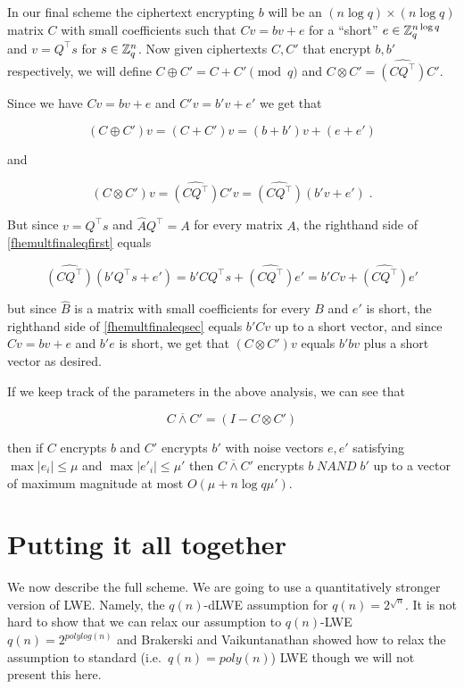 In our final scheme the ciphertext encrypting \(b\) will be an
\((n\log q)\times (n\log q)\) matrix \(C\) with small coefficients such
that \(Cv =bv + e\) for a ``short'' \(e \in {\mathbb{Z}}_q^{n\log q}\) and
\(v=Q^\top s\) for \(s\in{\mathbb{Z}}_q^n\). Now given ciphertexts \(C,C'\) that
encrypt \(b,b'\) respectively, we will define
\(C \oplus C' = C + C' \pmod{q}\) and
\(C \otimes C' = \widehat{(\ensuremath{\mathit{CQ}}^\top)}C'\).

Since we have \(Cv = bv + e\) and \(C'v = b'v + e'\) we get that

\[(C\oplus C')v = (C+C')v = (b+b')v + (e+e') \label{eqfheaddfinal}\]

and

\[(C\otimes C')v = \widehat{(\ensuremath{\mathit{CQ}}^\top)}C'v = \widehat{(\ensuremath{\mathit{CQ}}^\top)}(b'v+e') \;. \label{fhemultfinaleqfirst}\]

But since \(v=Q^\top s\) and \(\hat{A}Q^\top = A\) for every matrix
\(A\), the righthand side of \eqref{fhemultfinaleqfirst} equals

\[\widehat{(\ensuremath{\mathit{CQ}}^\top)}(b'Q^\top s+e')=b'C Q^\top s+\widehat{(\ensuremath{\mathit{CQ}}^\top)}e' = b'Cv + \widehat{(\ensuremath{\mathit{CQ}}^\top)}e' \label{fhemultfinaleqsec}\]

but since \(\widehat{B}\) is a matrix with small coefficients for every
\(B\) and \(e'\) is short, the righthand side of
\eqref{fhemultfinaleqsec} equals \(b'Cv\) up to a short vector, and
since \(Cv=bv+e\) and \(b'e\) is short, we get that \((C\otimes C')v\)
equals \(b'bv\) plus a short vector as desired.

If we keep track of the parameters in the above analysis, we can see
that

\[C \overline{\wedge} C' = (I - C \otimes C')\]

then if \(C\) encrypts \(b\) and \(C'\) encrypts \(b'\) with noise
vectors \(e,e'\) satisfying \(\max |e_i| \leq \mu\) and
\(\max |e'_i| \leq \mu'\) then \(C \overline{\wedge} C'\) encrypts
\(b \; \ensuremath{\mathit{NAND}}\; b'\) up to a vector of maximum
magnitude at most \(O(\mu + n\log q \mu')\).

\section{Putting it all together}\label{Putting-it-all-together}

We now describe the full scheme. We are going to use a quantitatively
stronger version of LWE. Namely, the \(q(n)\)-dLWE assumption for
\(q(n)=2^{\sqrt{n}}\). It is not hard to show that we can relax our
assumption to \(q(n)\)-LWE \(q(n)=2^{polylog(n)}\) and Brakerski and
Vaikuntanathan showed how to relax the assumption to standard
(i.e.~\(q(n)=poly(n)\)) LWE though we will not present this here.


